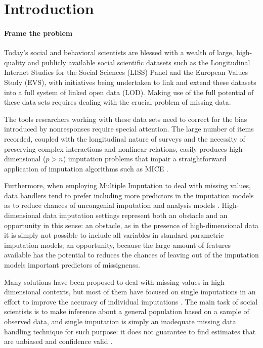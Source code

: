 \maketitle
\section{Introduction}

\paragraph{Frame the problem}

	Today’s social and behavioral scientists are blessed with a wealth of large, high-quality and publicly available social scientific datasets such as the Longitudinal Internet Studies for the Social Sciences (LISS) Panel and the European Values Study (EVS), with initiatives being undertaken to link and extend these datasets into a full system of linked open data (LOD). Making use of the full potential of these data sets requires dealing with the crucial problem of missing data. 

	The tools researchers working with these data sets need to correct for the bias introduced by nonresponses 
require special attention. The large number of items recorded, coupled with the longitudinal nature of surveys and the necessity
of preserving complex interactions and nonlinear relations, easily produces high-dimensional ($p>n$) imputation 
problems that impair a straightforward application of imputation algorithms such as MICE \citep{vanBuuren:2012}.

	Furthermore, when employing Multiple Imputation to deal with missing values, data handlers tend to prefer including more
predictors in the imputation models as to reduce chances of uncongenial imputation and analysis models \citep{meng:1994}.
High-dimensional data imputation settings represent both an obstacle and an opportunity in this sense: an 
obstacle, as in the presence of high-dimensional data it is simply not possible to include all variables in standard parametric
imputation models; an opportunity, because the large amount of features available has the potential to reduces the chances of 
leaving out of the imputation models important predictors of missignenss.

	Many solutions have been proposed to deal with missing values in high dimensional contexts, but most of them
have focused on single imputations in an effort to improve the accuracy of individual imputations \citep{kimEtAl:2005, 
stekhovenBuhlmann:2011, d'ambrosioEtAl:2012}.
The main task of social scientists is to make inference about a general population based on a sample of observed 
data, and single imputation is simply an inadequate missing data handling technique for such purpose: it 
does not guarantee to find estimates that are unbiased and confidence valid \citep{rubin:1996}.

